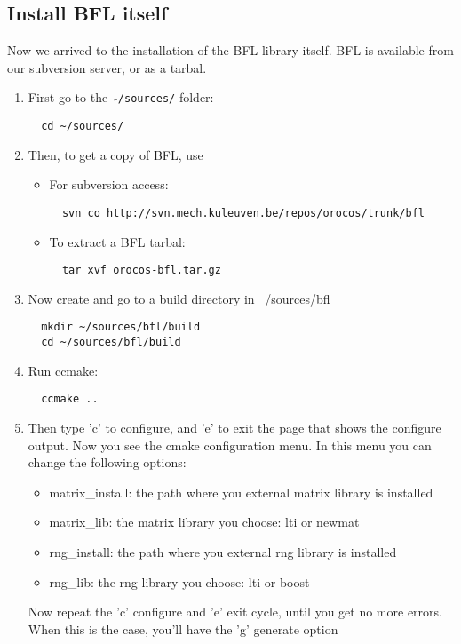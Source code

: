 \documentclass[a4paper,10pt]{article}
\begin{document}
\subsection{Install BFL itself}
Now we arrived to the installation of the BFL library itself. BFL is
available from our subversion server, or as a tarbal.
\begin{enumerate}
\item First go to the \ $\mathtt{\tilde{ }}$\texttt{/sources/} folder:
\begin{verbatim}
  cd ~/sources/
\end{verbatim}
\item Then, to get a copy of BFL, use
 \begin{itemize}
 \item For subversion access:
\begin{verbatim}
  svn co http://svn.mech.kuleuven.be/repos/orocos/trunk/bfl
\end{verbatim}
 \item To extract a BFL tarbal:
\begin{verbatim}
  tar xvf orocos-bfl.tar.gz
\end{verbatim}
\end{itemize}
\item Now create and go to a build directory in ~/sources/bfl
\begin{verbatim}
  mkdir ~/sources/bfl/build
  cd ~/sources/bfl/build
\end{verbatim}
\item Run ccmake:
\begin{verbatim}
  ccmake ..
\end{verbatim}
\item Then type 'c' to configure, and 'e' to exit the page that shows
  the configure output. Now you see the cmake configuration menu. In
  this menu you can change the following options:
\begin{itemize}
\item matrix\_install: the path where you external matrix library is
  installed
\item matrix\_lib: the matrix library you choose: lti or newmat
\item rng\_install: the path where you external rng library is
  installed
\item rng\_lib: the rng library you choose: lti or boost
\end{itemize}
Now repeat the 'c' configure and 'e' exit cycle, until you get no more
errors. When this is the case, you'll have the 'g' generate option

\end{enumerate}
\end{document}

